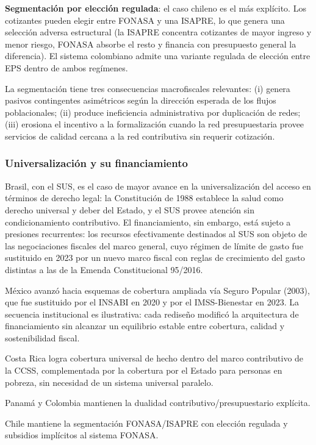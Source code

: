 \documentclass[12pt, letterpaper]{article}
\begin{document}
\textbf{Segmentación por elección regulada}: el caso chileno es el más explícito.
Los cotizantes pueden elegir entre FONASA y una ISAPRE, lo que genera una selección
adversa estructural (la ISAPRE concentra cotizantes de mayor ingreso y menor riesgo,
FONASA absorbe el resto y financia con presupuesto general la diferencia). El
sistema colombiano admite una variante regulada de elección entre EPS dentro de
ambos regímenes.

La segmentación tiene tres consecuencias macrofiscales relevantes: (i) genera
pasivos contingentes asimétricos según la dirección esperada de los flujos
poblacionales; (ii) produce ineficiencia administrativa por duplicación de redes;
(iii) erosiona el incentivo a la formalización cuando la red presupuestaria provee
servicios de calidad cercana a la red contributiva sin requerir cotización.

\subsubsection{Universalización y su financiamiento}

Brasil, con el SUS, es el caso de mayor avance en la universalización del acceso
en términos de derecho legal: la Constitución de 1988 establece la salud como
derecho universal y deber del Estado, y el SUS provee atención sin condicionamiento
contributivo. El financiamiento, sin embargo, está sujeto a presiones recurrentes:
los recursos efectivamente destinados al SUS son objeto de las negociaciones
fiscales del marco general, cuyo régimen de límite de gasto fue sustituido en 2023
por un nuevo marco fiscal con reglas de crecimiento del gasto distintas a las de la
Emenda Constitucional 95/2016.

México avanzó hacia esquemas de cobertura ampliada vía Seguro Popular (2003), que
fue sustituido por el INSABI en 2020 y por el IMSS-Bienestar en 2023. La
secuencia institucional es ilustrativa: cada rediseño modificó la arquitectura de
financiamiento sin alcanzar un equilibrio estable entre cobertura, calidad y
sostenibilidad fiscal.

Costa Rica logra cobertura universal de hecho dentro del marco contributivo de la
CCSS, complementada por la cobertura por el Estado para personas en pobreza, sin
necesidad de un sistema universal paralelo.

Panamá y Colombia mantienen la dualidad contributivo/presupuestario explícita.

Chile mantiene la segmentación FONASA/ISAPRE con elección regulada y subsidios
implícitos al sistema FONASA.
\end{document}

